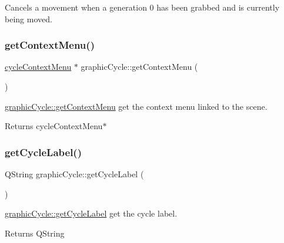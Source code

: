 Cancels a movement when a generation 0 has been grabbed and is currently being moved. \mbox{\label{classgraphic_cycle_a4e090d82ba2e37bee415c95630abe061}} 
\subsubsection{\texorpdfstring{get\+Context\+Menu()}{getContextMenu()}}
{\footnotesize\ttfamily \mbox{\hyperlink{classcycle_context_menu}{cycle\+Context\+Menu}} $\ast$ graphic\+Cycle\+::get\+Context\+Menu (\begin{DoxyParamCaption}{ }\end{DoxyParamCaption})}



\mbox{\hyperlink{classgraphic_cycle_a4e090d82ba2e37bee415c95630abe061}{graphic\+Cycle\+::get\+Context\+Menu}} get the context menu linked to the scene. 

\begin{DoxyReturn}{Returns}
cycle\+Context\+Menu$\ast$ 
\end{DoxyReturn}
\mbox{\label{classgraphic_cycle_ae55bb7487a8baac738b88e8c1bd0515e}} 
\subsubsection{\texorpdfstring{get\+Cycle\+Label()}{getCycleLabel()}}
{\footnotesize\ttfamily Q\+String graphic\+Cycle\+::get\+Cycle\+Label (\begin{DoxyParamCaption}{ }\end{DoxyParamCaption})}



\mbox{\hyperlink{classgraphic_cycle_ae55bb7487a8baac738b88e8c1bd0515e}{graphic\+Cycle\+::get\+Cycle\+Label}} get the cycle label. 

\begin{DoxyReturn}{Returns}
Q\+String 
\end{DoxyReturn}
\mbox{\label{classgraphic_cycle_a80b533c2477a08f98506202d94bad7bc}} 
